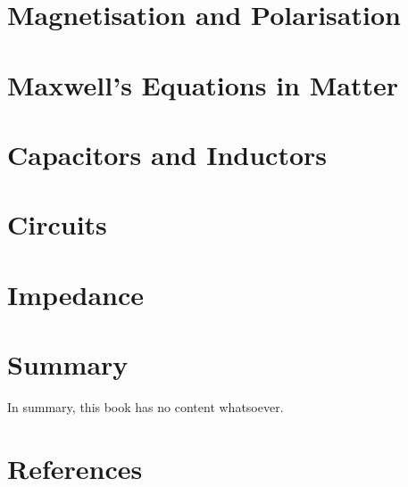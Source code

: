 \documentclass[
  letterpaper,
  DIV=11,
  numbers=noendperiod]{scrreprt}
\newlength{\cslhangindent}
\newenvironment{CSLReferences}[2] %
 {\begin{list}{}{%
  \setlength{\itemindent}{0pt}
  \setlength{\leftmargin}{0pt}
  \setlength{\parsep}{0pt}
  \ifodd #1
   \setlength{\leftmargin}{\cslhangindent}
   \setlength{\itemindent}{-1\cslhangindent}
  \fi
  \setlength{\itemsep}{#2\baselineskip}}}
 {\end{list}}
\begin{document}

\chapter{Magnetisation and
Polarisation}\label{magnetisation-and-polarisation}


\chapter{Maxwell's Equations in
Matter}\label{maxwells-equations-in-matter}


\chapter{Capacitors and Inductors}\label{capacitors-and-inductors}


\chapter{Circuits}\label{circuits}


\chapter{Impedance}\label{impedance}


\chapter{Summary}\label{summary-1}

In summary, this book has no content whatsoever.


\chapter*{References}\label{references}


\label{refs}
\begin{CSLReferences}{0}{1}
\end{CSLReferences}
\end{document}
